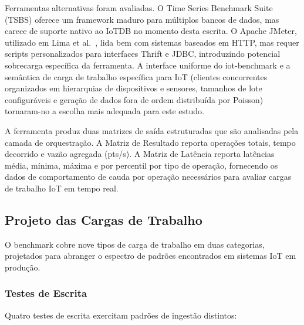 Ferramentas alternativas foram avaliadas. O Time Series Benchmark Suite (TSBS) oferece um
framework maduro para múltiplos bancos de dados, mas carece de suporte nativo ao IoTDB no
momento desta escrita. O Apache JMeter, utilizado em Lima et al.~\cite{lima2024avaliando},
lida bem com sistemas baseados em HTTP, mas requer scripts personalizados para interfaces
Thrift e JDBC, introduzindo potencial sobrecarga específica da ferramenta. A interface uniforme
do iot-benchmark e a semântica de carga de trabalho específica para IoT (clientes
  concorrentes organizados em hierarquias de dispositivos e sensores, tamanhos de lote
configuráveis e geração de dados fora de ordem distribuída por Poisson) tornaram-no a
escolha mais adequada para este estudo.

A ferramenta produz duas matrizes de saída estruturadas que são analisadas pela camada de
orquestração. A Matriz de Resultado reporta operações totais, tempo decorrido e vazão agregada
(pts/s). A Matriz de Latência reporta latências média, mínima, máxima e por percentil por tipo
de operação, fornecendo os dados de comportamento de cauda por operação necessários para
avaliar cargas de trabalho IoT em tempo real.

\subsection{Projeto das Cargas de Trabalho}
\label{sec:workload}

O benchmark cobre nove tipos de carga de trabalho em duas categorias, projetados para abranger
o espectro de padrões encontrados em sistemas IoT em produção.

\subsubsection{Testes de Escrita}

Quatro testes de escrita exercitam padrões de ingestão distintos:

